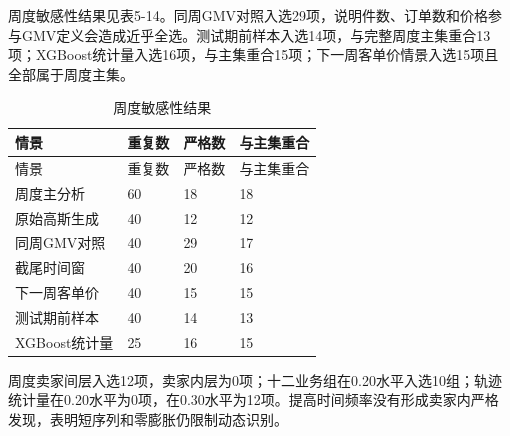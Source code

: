 \documentclass{sufethesismas}
\begin{document}
周度敏感性结果见表5-14。同周GMV对照入选29项，说明件数、订单数和价格参与GMV定义会造成近乎全选。测试期前样本入选14项，与完整周度主集重合13项；XGBoost统计量入选16项，与主集重合15项；下一周客单价情景入选15项且全部属于周度主集。

\begin{longtable}[]{@{}llll@{}}
\caption{周度敏感性结果}\tabularnewline
\toprule\noalign{}
情景 & 重复数 & 严格数 & 与主集重合 \\
\midrule\noalign{}
\endfirsthead
\toprule\noalign{}
情景 & 重复数 & 严格数 & 与主集重合 \\
\midrule\noalign{}
\endhead
\bottomrule\noalign{}
\endlastfoot
周度主分析 & 60 & 18 & 18 \\
原始高斯生成 & 40 & 12 & 12 \\
同周GMV对照 & 40 & 29 & 17 \\
截尾时间窗 & 40 & 20 & 16 \\
下一周客单价 & 40 & 15 & 15 \\
测试期前样本 & 40 & 14 & 13 \\
XGBoost统计量 & 25 & 16 & 15 \\
\end{longtable}

周度卖家间层入选12项，卖家内层为0项；十二业务组在0.20水平入选10组；轨迹统计量在0.20水平为0项，在0.30水平为12项。提高时间频率没有形成卖家内严格发现，表明短序列和零膨胀仍限制动态识别。
\end{document}
